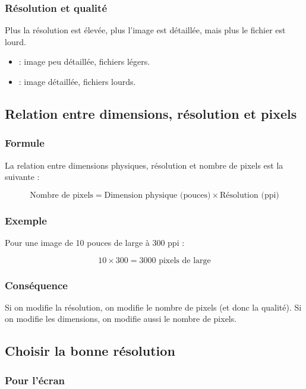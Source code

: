 \subsubsection{Résolution et qualité}

Plus la résolution est élevée, plus l'image est détaillée, mais plus le fichier est lourd.

\begin{itemize}
    \item {} : image peu détaillée, fichiers légers.
    \item {} : image détaillée, fichiers lourds.
\end{itemize}

\subsection{Relation entre dimensions, résolution et pixels}

\subsubsection{Formule}

La relation entre dimensions physiques, résolution et nombre de pixels est la suivante :

\[
\text{Nombre de pixels} = \text{Dimension physique (pouces)} \times \text{Résolution (ppi)}
\]

\subsubsection{Exemple}

Pour une image de 10 pouces de large à 300 ppi :

\[
10 \times 300 = 3000 \text{ pixels de large}
\]

\subsubsection{Conséquence}

Si on modifie la résolution, on modifie le nombre de pixels (et donc la qualité). Si on modifie les dimensions, on modifie aussi le nombre de pixels.

\subsection{Choisir la bonne résolution}

\subsubsection{Pour l'écran}

